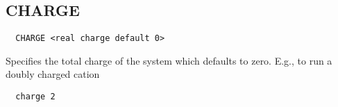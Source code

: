 \subsection{CHARGE}
\label{sec:charge}

\begin{verbatim}
  CHARGE <real charge default 0>
\end{verbatim}

Specifies the total charge of the system which defaults to zero.
E.g., to run a doubly charged cation
\begin{verbatim}
  charge 2
\end{verbatim}
